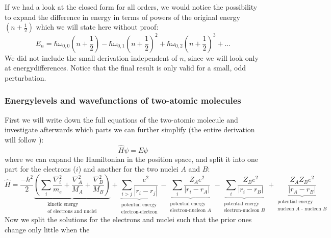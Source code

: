 If we had a look at the closed form for all orders, we would
notice the possibility to expand the difference in energy in terms
of powers of the original energy $(n+\frac{1}{2})$ which we will
state here without proof:
\begin{equation}
    E_n = \hbar \omega_{0,0} \left(n + \frac{1}{2} \right) 
    - \hbar \omega_{0,1} \left(n + \frac{1}{2} \right)^2  
    + \hbar \omega_{0,2} \left(n + \frac{1}{2} \right)^3  
    + \ldots
\end{equation}
We did not include the small derivation independent of $n$,
since we will look only at energydifferences. Notice that
the final result is only valid for a small, odd perturbation. 


\subsubsection{Energylevels and wavefunctions
    of two-atomic molecules}
First we will write down the full equations of the two-atomic
molecule and investigate afterwards which parts we can further
simplify (the entire derivation will follow \cite{staatsexamen}):
\begin{equation}
        \hat{H}\psi = E\psi 
\end{equation}
where we can expand the Hamiltonian in the position space,
and split it into one part for the electrons ($i$) and another 
for the two nuclei $A$ and $B$:
\begin{equation}
    \hat{H} = \frac{-\hbar^2}{2} 
        \underbrace{\left(
        \sum_{i}{\frac{\nabla_i^2}{m_e}}
        +\frac{\nabla_A^2}{M_A} +\frac{\nabla_B^2}{M_B}
\right)}_{
\substack{\text{kinetic energy}\\\text{of electrons and nuclei}}}
+ \underbrace{\sum_{i>j}{\frac{e^2}{|r_i - r_j|}}
    }_{\substack{\text{potential energy}\\\text{electron-electron}}}
 - \underbrace{\sum_{i}{\frac{Z_A e^2}{|r_i - r_A|}}
 }_{\substack{\text{potential energy}\\\text{electron-nucleon $A$}}}
 - \underbrace{\sum_{i}{\frac{Z_B e^2}{|r_i - r_B|}}
 }_{\substack{\text{potential energy}\\\text{electron-nucleon $B$}}}
 +  \underbrace{\frac{Z_A Z_B e^2}{|r_A - r_B|}
 }_{\substack{\text{potential energy}\\\text{nucleon $A$ - nucleon $B$}}}
\end{equation}
Now we split the solutions for the electrons and nuclei such
that the prior ones change only little when the
